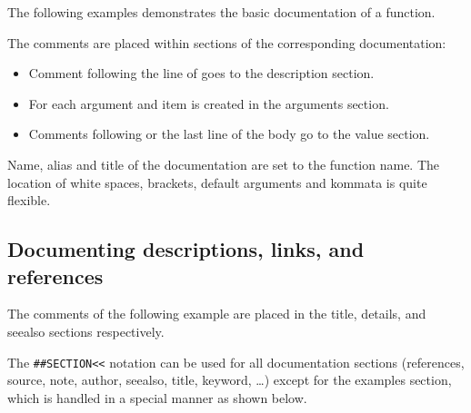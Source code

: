 \documentclass[article]{jss}
\begin{document}
The following examples demonstrates the basic documentation of a function.


The comments are placed within sections of the corresponding 
documentation:
\begin{itemize}
\item Comment following the line of  goes to the description
section.
\item For each argument and item is created in the arguments section.
\item Comments following  or the last line of the body go to the
value section.
\end{itemize} 

Name, alias and title of the documentation are set to the function name. The
location of white spaces, brackets, default arguments and kommata is quite flexible.

\subsection{Documenting descriptions, links, and references}
The comments of the following example are placed in the title, details, and
seealso sections respectively.
 


The \verb+##SECTION<<+ notation can be used for all documentation
sections (references, source, note, author, seealso, title, keyword, \ldots)
except for the examples section, which is handled in a special manner as shown below.
\end{document}
